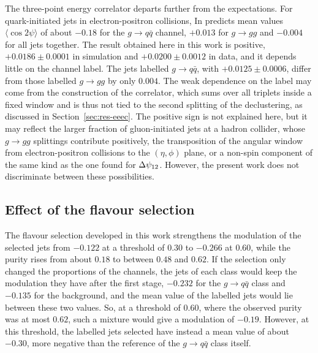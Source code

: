 The three-point energy correlator departs further from the expectations. 
For quark-initiated jets in electron-positron collisions, In \cite{Karlberg_2021} predicts mean
values $\langle \cos 2\psi \rangle$ of about $-0.18$ for the $g \to q\bar{q}$
channel, $+0.013$ for $g \to gg$ and $-0.004$ for all jets together. The result 
obtained here in this work is positive, $+0.0186 \pm 0.0001$ in simulation and
$+0.0200 \pm 0.0012$ in data, and it depends little on the channel label. The jets
labelled $g \to q\bar{q}$, with $+0.0125 \pm 0.0006$, differ from those labelled
$g \to gg$ by only $0.004$. The weak dependence on the label may come from 
the construction of the correlator, which sums over all triplets inside a fixed window
and is thus not tied to the second splitting of the declustering, as
discussed in Section~\ref{sec:res-eeec}. The positive sign is not explained here, but
it may reflect the larger fraction of gluon-initiated jets at a hadron collider,
whose $g \to gg$ splittings contribute positively, the transposition of the
angular window from electron-positron collisions to the $(\eta,\phi)$ plane, or a
non-spin component of the same kind as the one found for $\Delta\psi_{12}$. However,
the present work does not discriminate between these possibilities.

\subsection{Effect of the flavour selection}
\label{sec:disc-selection}

The flavour selection developed in this work strengthens the modulation of the selected jets from
$-0.122$ at a threshold of $0.30$ to $-0.266$ at $0.60$, while the purity rises
from about $0.18$ to between $0.48$ and $0.62$. If the selection only changed the proportions
of the channels, the jets of each class would keep the modulation they have after
the first stage, $-0.232$ for the $g \to q\bar{q}$ class and $-0.135$ for the
background, and the mean value of the labelled jets would lie between these two
values. So, at a threshold of $0.60$, where the observed purity was at most $0.62$, 
such a mixture would give a modulation of $-0.19$. However, at this threshold,
the labelled jets selected have instead a mean value of about $-0.30$, more negative than the reference of
the $g \to q\bar{q}$ class itself.

